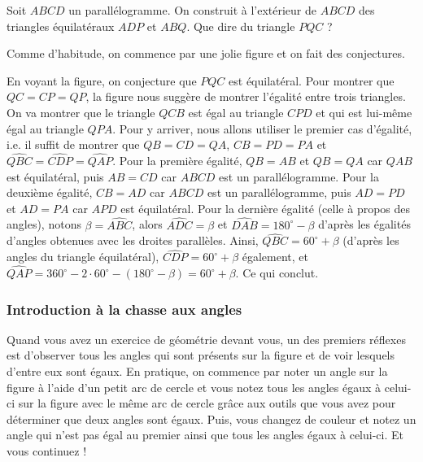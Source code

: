 \begin{exo}
Soit $ABCD$ un parallélogramme. On construit à l'extérieur de $ABCD$
des triangles équilatéraux $ADP$ et $ABQ$. Que dire du triangle
$PQC$ ?
\end{exo}

\begin{sol}
Comme d'habitude, on commence par une jolie figure et on fait des conjectures.
\begin{figure}[H]
\end{figure}
En voyant la figure, on conjecture que $PQC$ est équilatéral. Pour montrer que $QC=CP=QP$, la figure nous suggère de montrer l'égalité entre trois triangles. On va montrer que le triangle $QCB$ est égal au triangle $CPD$ et qui est lui-même égal au triangle $QPA$. Pour y arriver, nous allons utiliser le premier cas d'égalité, i.e. il suffit de montrer que $QB=CD=QA$, $CB=PD=PA$ et $\widehat{QBC}=\widehat{CDP}=\widehat{QAP}$. Pour la première égalité, $QB=AB$ et $QB=QA$ car $QAB$ est équilatéral, puis $AB=CD$ car $ABCD$ est un parallélogramme. Pour la deuxième égalité, $CB=AD$ car $ABCD$ est un parallélogramme, puis $AD=PD$ et $AD=PA$ car $APD$ est équilatéral. Pour la dernière égalité (celle à propos des angles), notons $\beta=\widehat{ABC}$, alors $\widehat{ADC}=\beta$ et $\widehat{DAB}=180^\circ-\beta$ d'après les égalités d'angles obtenues avec les droites parallèles. Ainsi, $\widehat{QBC}=60^\circ+\beta$ (d'après les angles du triangle équilatéral), $\widehat{CDP}=60^\circ+\beta$ également, et $\widehat{QAP}=360^\circ-2\cdot 60^\circ-(180^\circ-\beta)=60^\circ+\beta$. Ce qui conclut.
\end{sol}

\subsubsection{Introduction à la chasse aux angles}
Quand vous avez un exercice de géométrie devant vous, un des premiers réflexes est d'observer tous les angles qui sont présents sur la figure et de voir lesquels d'entre eux sont égaux. En pratique, on commence par noter un angle sur la figure à l'aide d'un petit arc de cercle et vous notez tous les angles égaux à celui-ci sur la figure avec le même arc de cercle grâce aux outils que vous avez pour déterminer que deux angles sont égaux. Puis, vous changez de couleur et notez un angle qui n'est pas égal au premier ainsi que tous les angles égaux à celui-ci. Et vous continuez !

